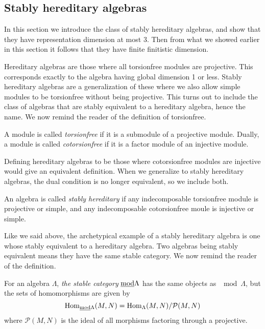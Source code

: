\subsection{Stably hereditary algebras}\label{sec:stable_hereditary_algebras}

In this section we introduce the class of stably hereditary algebras, and show that they have representation dimension at most 3. Then from what we showed earlier in this section it follows that they have finite finitistic dimension.

Hereditary algebras are those where all torsionfree modules are projective. This corresponds exactly to the algebra having global dimension 1 or less. Stably hereditary algebras are a generalization of these where we also allow simple modules to be torsionfree without being projective. This turns out to include the class of algebras that are stably equivalent to a hereditary algebra, hence the name. We now remind the reader of the definition of torsionfree. 

\begin{defn}[(co)torsionfree]
	A module is called \emph{torsionfree} if it is a submodule of a projective module. Dually, a module is called \emph{cotorsionfree} if it is a factor module of an injective module.
\end{defn}

Defining hereditary algebras to be those where cotorsionfree modules are injective would give an equivalent definition. When we generalize to stably hereditary algebras, the dual condition is no longer equivalent, so we include both.

\begin{defn}
	An algebra is called \emph{stably hereditary} if any indecomposable torsionfree module is projective or simple, and any indecomposable cotorsionfree moule is injective or simple. 
\end{defn}

Like we said above, the archetypical example of a stably hereditary algebra is one whose stably equivalent to a hereditary algebra. Two algebras being stably equivalent means they have the same stable category. We now remind the reader of the definition.

\begin{defn}
	For an algebra $\Lambda$, \emph{the stable category} $\underline{\mod}\Lambda$ has the same objects as $\mod\Lambda$, but the sets of homomorphisms are given by $$\Hom_{\underline{\mod}\Lambda}(M, N) = \Hom_\Lambda(M,N)/\mathcal{P}(M,N)$$
	where $\mathcal{P}(M,N)$ is the ideal of all morphisms factoring through a projective.
\end{defn}

